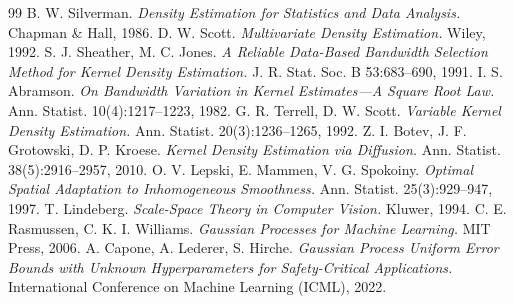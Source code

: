 \documentclass[10pt,twocolumn]{article}
\begin{document}
\begin{thebibliography}{99}
\small
{} B. W. Silverman. \emph{Density Estimation for Statistics and Data Analysis.} Chapman \& Hall, 1986.
 D. W. Scott. \emph{Multivariate Density Estimation.} Wiley, 1992.
 S. J. Sheather, M. C. Jones. \emph{A Reliable Data-Based Bandwidth Selection Method for Kernel Density Estimation.} J. R. Stat. Soc. B 53:683--690, 1991.
 I. S. Abramson. \emph{On Bandwidth Variation in Kernel Estimates---A Square Root Law.} Ann. Statist. 10(4):1217--1223, 1982.
 G. R. Terrell, D. W. Scott. \emph{Variable Kernel Density Estimation.} Ann. Statist. 20(3):1236--1265, 1992.
 Z. I. Botev, J. F. Grotowski, D. P. Kroese. \emph{Kernel Density Estimation via Diffusion.} Ann. Statist. 38(5):2916--2957, 2010.
 O. V. Lepski, E. Mammen, V. G. Spokoiny. \emph{Optimal Spatial Adaptation to Inhomogeneous Smoothness.} Ann. Statist. 25(3):929--947, 1997.
 T. Lindeberg. \emph{Scale-Space Theory in Computer Vision.} Kluwer, 1994.
 C. E. Rasmussen, C. K. I. Williams. \emph{Gaussian Processes for Machine Learning.} MIT Press, 2006.
 A. Capone, A. Lederer, S. Hirche. \emph{Gaussian Process Uniform Error Bounds with Unknown Hyperparameters for Safety-Critical Applications.} International Conference on Machine Learning (ICML), 2022.



\end{thebibliography}
\end{document}
